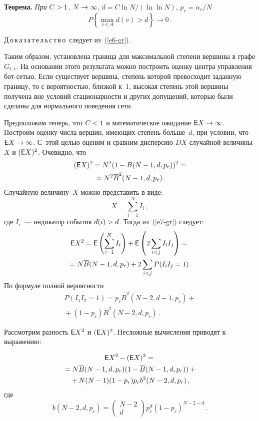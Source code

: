 \begin{multicols}{2}
     \noindent
     \textbf{Теорема.} \textit{При} $C\hm>1$, $N\hm\rightarrow\infty$, $d=C\ln N/(\ln \ln 
N)$, $p_r=\alpha_r/N$
     $$
     P\left\{ \max\limits_{v\in A} d(v)>d\right\}\rightarrow 0\,.
     $$
     
     \noindent
     Д\,о\,к\,а\,з\,а\,т\,е\,л\,ь\,с\,т\,в\,о\ следует из~(\ref{e6-gr}). 
     
     \smallskip
     
     Таким образом, установлена граница для максимальной степени вершины в графе 
$G_{t,r}$. На основании этого результата можно построить оценку центра управления 
бот-сетью. Если существует вершина, степень которой превосходит заданную границу, то 
с вероятностью, близкой к~1, высокая степень этой вершины получена вне условий 
стационарности и других допущений, которые были сделаны для нормального поведения 
сети. 
     
     Предположим теперь, что $C\hm<1$ и математическое ожидание 
${\sf E}X\hm\rightarrow\infty$. Построим оценку числа вершин, имеющих степень больше~$d$, 
при условии, что ${\sf E}X\hm\rightarrow\infty$. С~этой целью оценим и сравним дисперсию 
$DX$ случайной величины~$X$ и $({\sf E}X)^2$. Очевидно, что 
     \begin{multline*}
     ({\sf E}X)^2=N^2(1-B(N-1,d,p_r))^2=\\
     {}=N^2\overline{B}^2(N-1,d,p_r)\,.
     \end{multline*}
Случайную величину~$X$ можно представить в виде:
\begin{equation}
X=\sum\limits_{i=1}^N I_i\,,
\label{e7-gr}
\end{equation}
где $I_i$~--- индикатор события $d(i)\hm>d$. Тогда из~(\ref{e7-gr}) следует:
\begin{multline*}
{\sf E}X^2={\sf E}\left( \sum\limits_{i=1}^N I_i\right) +{\sf E}
\left( 2\sum\limits_{i<j}I_iI_j\right) ={}\\
{}=
N\overline{B}(N-1,d,p_r) +2\sum\limits_{i<j}P(I_iI_j=1)\,.
\end{multline*}
По формуле полной вероятности
\begin{multline*}
P(I_1I_2=1)=p_r\overline{B}^2(N-2,d-1, p_r)+{}\\
{}+(1-p_r)\overline{B}^2(N-2,d,p_r)\,.
\end{multline*}
     
     Рассмотрим разность ${\sf E}X^2$ и $({\sf E}X)^2$. Несложные вычисления приводят к 
выражению:

\pagebreak

\noindent
     \begin{multline*}
{\sf E}X^2-({\sf E}X)^2={}\\
     {}=N\overline{B}(N-1,d,p_r)(1-\overline{B}(N-1,d,p_r))+{}\\
     {}+N(N-1)(1-p_r)p_r b^2(N-2,d,p_r)\,,
     \end{multline*}
где 
$$
b(N-2,d,p_r)=\begin{pmatrix}
N-2 \\ d\end{pmatrix} p_r^d(1-p_r)^{N-2-d}\,.
$$
     

\end{multicols}
